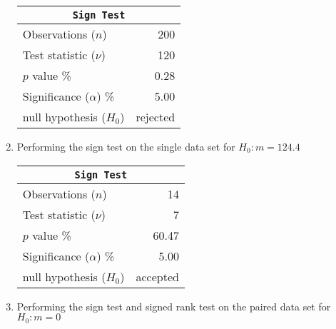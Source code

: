 \begin{enumerate}
	\begin{table}[H]
		\centering
		\begin{tabular}{@{}lr@{}}
			\toprule
			\multicolumn{2}{c}{\texttt{Sign Test}} \\
			\midrule
			Observations ($n$)         &       200 \\
			Test statistic ($\nu$)     &       120 \\
			$p$ value \%               &      0.28 \\
			Significance ($\alpha$) \% &      5.00 \\
			null hypothesis ($H_0$)    &  rejected \\
			\bottomrule
		\end{tabular}
		
	\end{table}
	\bigskip
	
	\item Performing the sign test on the single data set for $ H_0 : m = 124.4 $\\
	
	\begin{table}[H]
		\centering
		\begin{tabular}{@{}lr@{}}
			\toprule
			\multicolumn{2}{c}{\texttt{Sign Test}} \\
			\midrule
			Observations ($n$)         &        14 \\
			Test statistic ($\nu$)     &         7 \\
			$p$ value \%               &     60.47 \\
			Significance ($\alpha$) \% &      5.00 \\
			null hypothesis ($H_0$)    &  accepted \\
			\bottomrule
		\end{tabular}
		
	\end{table}
	\bigskip
	
	\item Performing the sign test and signed rank test on the paired data set for $ H_0 : m = 0 $ \\
	

\end{enumerate}
